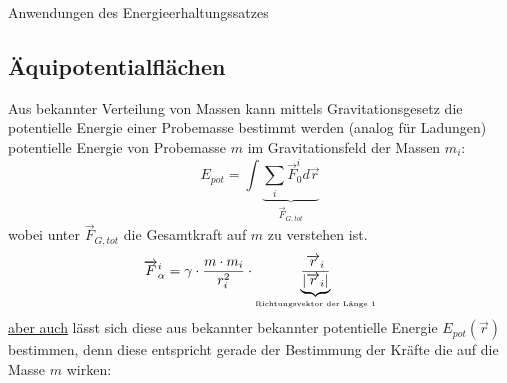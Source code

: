 \documentclass[a4paper,10pt]{scrartcl}
\begin{document}
\begin{seg}{Anwendungen des Energieerhaltungssatzes}
\subsection{Äquipotentialflächen}
Aus bekannter Verteilung von Massen kann mittels Gravitationsgesetz die potentielle Energie einer Probemasse bestimmt werden (analog für Ladungen) potentielle Energie von Probemasse $m$ im Gravitationsfeld der Massen $m_i$:
\[
 E_{pot}=\int\underbrace{\sum_i\vec F_0^id\vec{r}}_{\vec F_{G, tot}}
\]
wobei unter $\vec F_{G,tot}$ die Gesamtkraft auf $m$ zu verstehen ist.
\[
 \vec F_\alpha^i=\gamma\cdot \frac{m\cdot m_i}{r_i^2}\cdot\underbrace{\frac{\vec r_i}{|\vec r_i|}}_{\text{\tiny{Richtungsvektor der Länge $1$}}}
\]
\underline{aber auch} lässt sich diese aus bekannter bekannter potentielle Energie $E_{pot}(\vec r)$ bestimmen, denn diese entspricht gerade der Bestimmung der Kräfte die auf die Masse $m$ wirken:


\end{seg}
\end{document}
